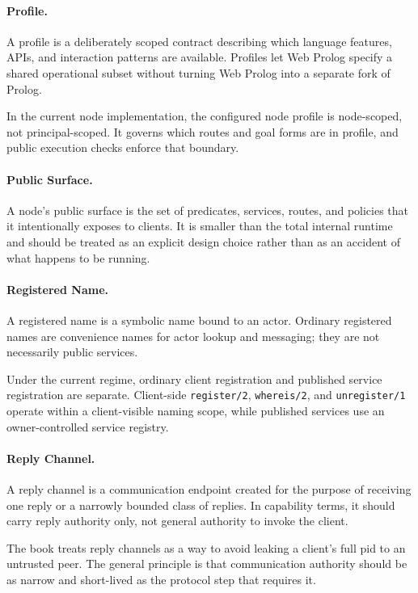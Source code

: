 \paragraph{Profile.}
A profile is a deliberately scoped contract describing which language features,
APIs, and interaction patterns are available. Profiles let Web Prolog specify a
shared operational subset without turning Web Prolog into a separate fork of
Prolog.

In the current node implementation, the configured node profile is node-scoped,
not principal-scoped. It governs which routes and goal forms are in profile, and
public execution checks enforce that boundary.

\paragraph{Public Surface.}
A node's public surface is the set of predicates, services, routes, and policies
that it intentionally exposes to clients. It is smaller than the total internal
runtime and should be treated as an explicit design choice rather than as an
accident of what happens to be running.

\paragraph{Registered Name.}
A registered name is a symbolic name bound to an actor. Ordinary registered
names are convenience names for actor lookup and messaging; they are not
necessarily public services.

Under the current regime, ordinary client registration and published service
registration are separate. Client-side \texttt{register/2}, \texttt{whereis/2},
and \texttt{unregister/1} operate within a client-visible naming scope, while
published services use an owner-controlled service registry.

\paragraph{Reply Channel.}
A reply channel is a communication endpoint created for the purpose of receiving
one reply or a narrowly bounded class of replies. In capability terms, it should
carry reply authority only, not general authority to invoke the client.

The book treats reply channels as a way to avoid leaking a client's full pid to
an untrusted peer. The general principle is that communication authority should
be as narrow and short-lived as the protocol step that requires it.

